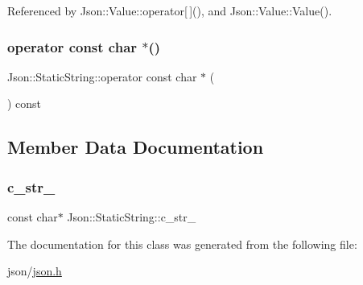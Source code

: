 Referenced by Json\+::\+Value\+::operator\mbox{[}$\,$\mbox{]}(), and Json\+::\+Value\+::\+Value().

\mbox{\label{classJson_1_1StaticString_a256a6cc0c630aef670848a0f11707b62_a256a6cc0c630aef670848a0f11707b62}} 
\subsubsection{\texorpdfstring{operator const char $\ast$()}{operator const char *()}}
{\footnotesize\ttfamily Json\+::\+Static\+String\+::operator const char $\ast$ (\begin{DoxyParamCaption}{ }\end{DoxyParamCaption}) const\hspace{0.3cm}{\ttfamily [inline]}}



\subsection{Member Data Documentation}
\mbox{\label{classJson_1_1StaticString_a9f0d9e8caee8f8db14e2c8c24760dffd_a9f0d9e8caee8f8db14e2c8c24760dffd}} 
\subsubsection{\texorpdfstring{c\+\_\+str\+\_\+}{c\_str\_}}
{\footnotesize\ttfamily const char$\ast$ Json\+::\+Static\+String\+::c\+\_\+str\+\_\+\hspace{0.3cm}{\ttfamily [private]}}



The documentation for this class was generated from the following file\+:\begin{DoxyCompactItemize}
\item 
json/\hyperlink{json_8h}{json.\+h}\end{DoxyCompactItemize}
